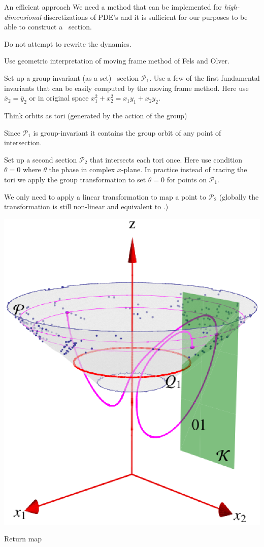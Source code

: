 \documentclass{theo1poster}[2003/04/25]
\renewcommand{\labelitemi}{\ding{228}}
\renewenvironment{itemize}%
 {\begin{list}{\labelitemi}%
       {%
        \setlength{\leftmargin}{0pt}%
        \setlength{\itemindent}{0pt}%
        \settowidth{\labelwidth}{\labelitemi}%
        \addtolength{\labelsep}{\itemindent}
        \addtolength{\leftmargin}{\labelwidth}%
        \addtolength{\leftmargin}{\labelsep}%
        \addtolength{\leftmargin}{-\itemindent}%
       }%
 }
 {\end{list}}
\begin{document}
\begin{poster}{3}
\begin{sheet}{An efficient approach}
We need a method that can be implemented for \emph{high-dimensional} discretizations of PDE's
and it is sufficient for our purposes to be able to construct a \Poincare~section.
\begin{itemize}
 \item Do not attempt to rewrite the dynamics.
 \item Use geometric interpretation of moving frame method of Fels and Olver.
 \item Set up a group-invariant (as a set) \Poincare~section $\mathcal{P}_1$. Use
	a few of the first fundamental invariants that can be easily computed by
	the moving frame method. Here use $\overline{x}_2=\overline{y}_2$ or in original
	space $x_1^2+x_2^2=x_1 y_1 + x_2 y_2$.
 \item Think orbits as tori (generated by the action of the group)
 \item Since $\mathcal{P}_1$ is group-invariant it contains the group
	orbit of any point of intersection. 
 \item Set up a second section $\mathcal{P}_2$ that intersects each tori once. 
	Here use condition $\theta=0$ where $\theta$ the phase in complex $x$-plane. In practice instead of tracing the tori we apply the group transformation to set $\theta=0$ for points on $\mathcal{P}_1$.
 \item We only need to apply a linear transformation to map a point to $\mathcal{P}_2$ (globally
	the transformation is still non-linear and equivalent to .)
\end{itemize}

 \begin{center}
 	 	\includegraphics[width=.38\textwidth]{../../figs/CLEmartini.eps}
 \end{center} 

\end{sheet}

 
\begin{sheet}{Return map}
 

\end{sheet}
\end{poster}
\end{document}
